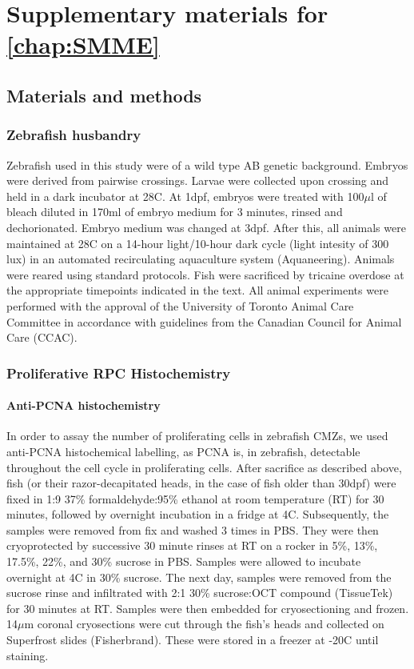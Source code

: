 \chapter{Supplementary materials for \autoref{chap:SMME}}
\label{chap:SMMsupp}
\section{Materials and methods}
\subsection{Zebrafish husbandry}
Zebrafish used in this study were of a wild type AB genetic background. Embryos were derived from pairwise crossings. Larvae were collected upon crossing and held in a dark incubator at 28\textdegree C. At 1dpf, embryos were treated with 100$\mu$l of bleach diluted in 170ml of embryo medium for 3 minutes, rinsed and dechorionated. Embryo medium was changed at 3dpf. After this, all animals were maintained at 28\textdegree C on a 14-hour light/10-hour dark cycle (light intesity of 300 lux) in an automated recirculating aquaculture system (Aquaneering). Animals were reared using standard protocols\cite{Westerfield2000}. Fish were sacrificed by tricaine overdose at the appropriate timepoints indicated in the text. All animal experiments were performed with the approval of the University of Toronto Animal Care Committee in accordance with guidelines from the Canadian Council for Animal Care (CCAC).
 
\subsection{Proliferative RPC Histochemistry}
\subsubsection{Anti-PCNA histochemistry}
In order to assay the number of proliferating cells in zebrafish CMZs, we used anti-PCNA histochemical labelling, as PCNA is, in zebrafish, detectable throughout the cell cycle in proliferating cells. After sacrifice as described above, fish (or their razor-decapitated heads, in the case of fish older than 30dpf) were fixed in 1:9 37\% formaldehyde:95\% ethanol at room temperature (RT) for 30 minutes, followed by overnight incubation in a fridge at 4\textdegree C. Subsequently, the samples were removed from fix and washed 3 times in PBS. They were then cryoprotected by successive 30 minute rinses at RT on a rocker in 5\%, 13\%, 17.5\%, 22\%, and 30\% sucrose in PBS. Samples were allowed to incubate overnight at 4\textdegree C in 30\% sucrose. The next day, samples were removed from the sucrose rinse and infiltrated with 2:1 30\% sucrose:OCT compound (TissueTek) for 30 minutes at RT. Samples were then embedded for cryosectioning and frozen. 14$\mu$m coronal cryosections were cut through the fish's heads and collected on Superfrost slides (Fisherbrand). These were stored in a freezer at -20\textdegree C until staining.

